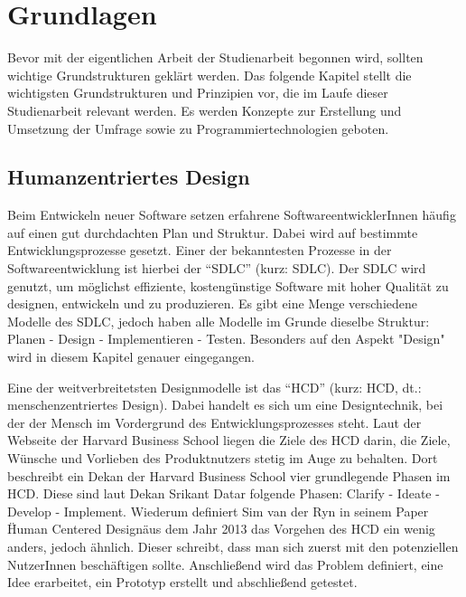 
\chapter{Grundlagen}
\label{chapter:3}

Bevor mit der eigentlichen Arbeit der Studienarbeit begonnen wird, sollten wichtige Grundstrukturen geklärt werden. Das folgende Kapitel stellt die wichtigsten Grundstrukturen und Prinzipien vor, die im Laufe dieser Studienarbeit relevant werden. Es werden Konzepte zur Erstellung und Umsetzung der Umfrage sowie zu Programmiertechnologien geboten.

\section{Humanzentriertes Design}

Beim Entwickeln neuer Software setzen erfahrene SoftwareentwicklerInnen häufig auf einen gut durchdachten Plan und Struktur. Dabei wird auf bestimmte Entwicklungsprozesse gesetzt. Einer der bekanntesten Prozesse in der Softwareentwicklung ist hierbei der “\acf{SDLC}” (kurz: \acs{SDLC}). Der \acs{SDLC} wird genutzt, um möglichst effiziente, kostengünstige Software mit hoher Qualität zu designen, entwickeln und zu produzieren.\cite{shylesh:2017} Es gibt eine Menge verschiedene Modelle des \acs{SDLC}, jedoch haben alle Modelle im Grunde dieselbe Struktur: Planen - Design - Implementieren - Testen. Besonders auf den Aspekt "Design" wird in diesem Kapitel genauer eingegangen.

Eine der weitverbreitetsten Designmodelle ist das “\acf{HCD}” (kurz: \acs{HCD}, dt.: menschenzentriertes Design). Dabei handelt es sich um eine Designtechnik, bei der der Mensch im Vordergrund des Entwicklungsprozesses steht. Laut der Webseite der Harvard Business School liegen die Ziele des \acs{HCD} darin, die Ziele, Wünsche und Vorlieben des Produktnutzers stetig im Auge zu behalten. Dort beschreibt ein Dekan der Harvard Business School vier grundlegende Phasen im \acs{HCD}. Diese sind laut Dekan Srikant Datar folgende Phasen: Clarify - Ideate - Develop - Implement. Wiederum definiert Sim van der Ryn in seinem Paper \"Human Centered Design\" aus dem Jahr 2013 das Vorgehen des \acs{HCD} ein wenig anders, jedoch ähnlich. Dieser schreibt, dass man sich zuerst mit den potenziellen NutzerInnen beschäftigen sollte. Anschließend wird das Problem definiert, eine Idee erarbeitet, ein Prototyp erstellt und abschließend getestet.\cite{vanderryn:2013, hbsc:2020}

